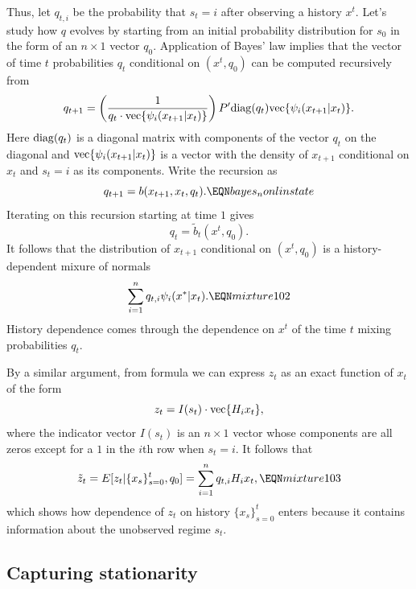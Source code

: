 Thus, let $q_{t,i} $ be the probability that $s_t = i$ after observing a history $x^t$. Let's study 
how $q$ evolves by  starting from 
an initial probability distribution  for $s_0$ in the form of an $n \times 1$ vector $q_0$. 
 Application of Bayes' law implies that the vector of 
time $t$ probabilities 
$q_t$  conditional on $(x^t, q_0)$  can be computed recursively from 
    $$ q_{t+1} = \left( {\frac{1}{q_t \cdot {\rm vec}\{\psi_i(x_{t+1}|x_t)\} } } \right)
        P' {\rm diag}(q_t) {\rm vec}\{\psi_i(x_{t+1}|x_t)\}. $$ Here ${\rm diag}(q_t)$ is a diagonal matrix 
        with components of the vector  $q_t$ on the diagonal and   ${\rm vec}\{\psi_i(x_{t+1}|x_t)\}$
        is a vector with the density of $x_{t+1}$ conditional on $x_t$ and $s_t =i$ as its components.
Write the recursion as 
$$ q_{t+1} = b(x_{t+1}, x_t, q_t). \EQN bayes_nonlinstate $$
Iterating on this recursion starting at time $1$ gives
$$ q_{t} = \tilde b_t(x^t, q_0) . $$
It follows that the distribution of $x_{t+1} $ conditional on $(x^t, q_0)$ is a history-dependent mixure of normals
$$ \sum_{i=1}^n q_{t,i} \psi_i(x^* | x_t). \EQN mixture102 $$
History dependence comes through the dependence on $x^t$ of the time $t$ mixing probabilities $q_t$.

By a similar argument, from formula  we can express    $z_t$ as an  exact function %
of $x_t$ of the form 
$$ z_t = I(s_t) \cdot {\rm vec} \{ H_i x_t \} , $$
where the indicator vector $I(s_t)$ is an $n \times 1$ vector whose components are  all zeros except for a $1$ in the $i$th row when $s_t=i$.  It follows  that 
$$ \tilde z_t = E [ z_t |  \{x_s\}_{s=0}^t, q_0]  = \sum_{i=1}^n  q_{t,i} H_i x_t,  \EQN mixture103 $$
which shows how dependence of $z_t$ on  history $ \{x_s\}_{s=0}^t$ enters because it  contains information
about the unobserved regime $s_t$. 


\subsection{Capturing stationarity}

